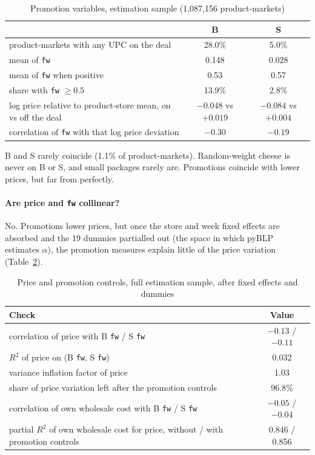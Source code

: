 \documentclass[11pt]{article}
\newcommand{\code}[1]{\texttt{#1}}
\begin{document}
\begin{table}[htbp]
\centering
\small
\caption{Promotion variables, estimation sample (1,087,156 product-markets)}
\label{tab:promo-desc}
\begin{tabular}{@{}lcc@{}}
\toprule
 & B & S \\
\midrule
product-markets with any UPC on the deal & 28.0\% & 5.0\% \\
mean of \code{fw} & 0.148 & 0.028 \\
mean of \code{fw} when positive & 0.53 & 0.57 \\
share with \code{fw} $\ge 0.5$ & 13.9\% & 2.8\% \\
log price relative to product-store mean, on vs off the deal & $-0.048$ vs $+0.019$ &
    $-0.084$ vs $+0.004$ \\
correlation of \code{fw} with that log price deviation & $-0.30$ & $-0.19$ \\
\bottomrule
\end{tabular}
\end{table}

B and S rarely coincide (1.1\% of product-markets). Random-weight cheese is never on B or S, and
small packages rarely are. Promotions coincide with lower prices, but far from perfectly.

\paragraph{Are price and \code{fw} collinear?} No. Promotions lower prices, but once the store
and week fixed effects are absorbed and the 19 dummies partialled out (the space in which pyBLP
estimates $\alpha$), the promotion measures explain little of the price variation
(Table~\ref{tab:promo-collin}).

\begin{table}[htbp]
\centering
\small
\caption{Price and promotion controls, full estimation sample, after fixed effects and
dummies}\label{tab:promo-collin}
\begin{tabular}{@{}lc@{}}
\toprule
Check & Value \\
\midrule
correlation of price with B \code{fw} / S \code{fw} & $-0.13$ / $-0.11$ \\
$R^2$ of price on (B \code{fw}, S \code{fw}) & 0.032 \\
variance inflation factor of price & 1.03 \\
share of price variation left after the promotion controls & 96.8\% \\
correlation of own wholesale cost with B \code{fw} / S \code{fw} & $-0.05$ / $-0.04$ \\
partial $R^2$ of own wholesale cost for price, without / with promotion controls &
    0.846 / 0.856 \\
\bottomrule
\end{tabular}
\end{table}
\end{document}
